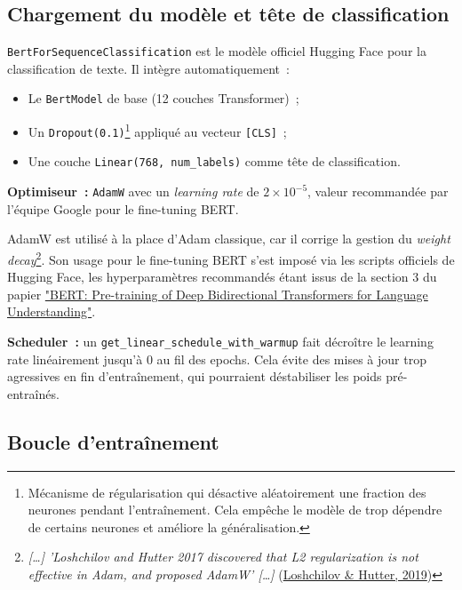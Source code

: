 \documentclass[12pt,a4paper]{report}
\begin{document}
\subsection{Chargement du modèle et tête de classification}

\texttt{BertForSequenceClassification} est le modèle officiel Hugging Face pour la
classification de texte. Il intègre automatiquement~:
\begin{itemize}[leftmargin=1.5cm]
  \item Le \texttt{BertModel} de base (12 couches Transformer)~;
  \item Un \texttt{Dropout(0.1)}\footnote[1]{Mécanisme de régularisation qui désactive aléatoirement une fraction des neurones
pendant l'entraînement. Cela empêche le modèle de trop dépendre de certains neurones
et améliore la généralisation.} appliqué au vecteur \texttt{[CLS]}~;
  \item Une couche \texttt{Linear(768, num\_labels)} comme tête de classification.
\end{itemize}

\textbf{Optimiseur~:} \texttt{AdamW} avec un \textit{learning rate} de $2\times10^{-5}$,
valeur recommandée par l'équipe Google pour le fine-tuning BERT.

\begin{tip}
AdamW est utilisé à la place d'Adam classique, car il corrige la gestion du \textit{weight decay}\footnote{\textit{[\ldots] 'Loshchilov and Hutter 2017 discovered that L2 regularization is not effective in Adam, and proposed AdamW' [\ldots]}
(\href{https://docs.graphcore.ai/projects/bert-training/en/latest/bert.html}{Loshchilov \& Hutter, 2019})}.
Son usage pour le fine-tuning BERT s'est imposé via les scripts officiels de Hugging Face, 
les hyperparamètres recommandés étant issus de la section 3 du papier \href{https://arxiv.org/pdf/1810.04805}{"BERT: Pre-training of Deep Bidirectional Transformers for
Language Understanding"}.
\end{tip}

\textbf{Scheduler~:} un \texttt{get\_linear\_schedule\_with\_warmup} fait décroître le
learning rate linéairement jusqu'à 0 au fil des epochs. Cela évite des mises à jour trop
agressives en fin d'entraînement, qui pourraient déstabiliser les poids pré-entraînés.

\pagebreak

\subsection{Boucle d'entraînement}
\end{document}
